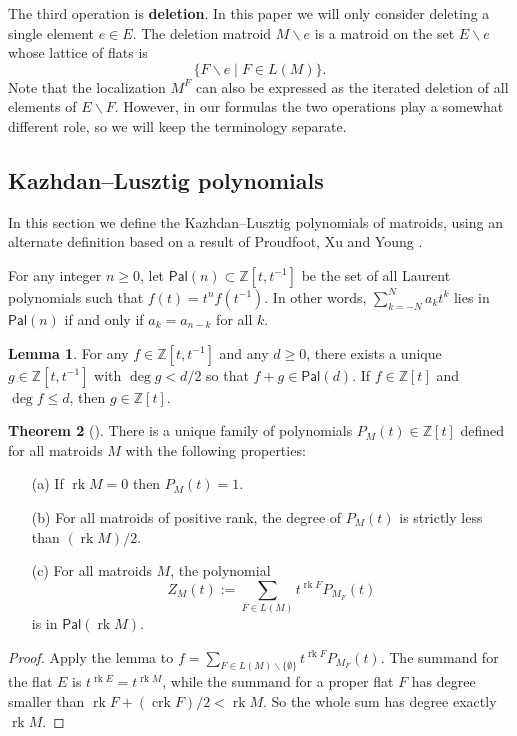 \documentclass[12pt,reqno]{amsart}
\theoremstyle{definition}
\newtheorem{theorem}{Theorem}[section]
\newtheorem{lemma}[theorem]{Lemma}
\theoremstyle{remark}
\newcommand{\crk}{\operatorname{crk}}
\newcommand{\ssm}{\smallsetminus}
\newcommand{\rk}{\operatorname{rk}}
\newcommand{\Z}{{\mathbb{Z}}}
\renewcommand{\(}{\left(}
\renewcommand{\)}{\right)}
\newcommand{\<}{\left<}
\renewcommand{\>}{\right>}
\renewcommand{\setminus}{\smallsetminus}
\newcommand{\Pal}{\mathsf{Pal}}
\begin{document}
The third operation is \textbf{deletion}.  In this paper we will only consider deleting a single element $e \in E$.  The deletion matroid $M \ssm e$ is a matroid on the set $E \ssm e$ whose lattice of flats is 
\[\{F \ssm e \mid F \in L(M)\}.\]
Note that the localization $M^F$ can also be expressed as the iterated deletion of all elements of $E \setminus F$.  However, in our formulas the two operations play a somewhat different role, so we will keep the terminology separate.

\subsection{Kazhdan--Lusztig polynomials}

In this section we define the Kazhdan--Lusztig polynomials of matroids, using an alternate definition based on a result of Proudfoot, Xu and Young \cite{PXY}.

For any integer $n\ge 0$, let  $\Pal(n) \subset \Z[t, t^{-1}]$ be the set of all Laurent polynomials
such that $f(t) = t^n f(t^{-1})$.  In other words,
$\sum_{k=-N}^N a_kt^k$ lies in $\Pal(n)$ if and only if $a_k = a_{n-k}$ for all $k$.

\begin{lemma}\label{lem:palindromic}
For any  $f\in \Z[t,t^{-1}]$ and any $d \ge 0$, there exists a unique $g \in \Z[t,t^{-1}]$ with $\deg g < d/2$ so that $f + g \in \Pal(d)$.  If $f \in \Z[t]$ and $\deg f \le d$, then $g \in \Z[t]$.
\end{lemma}

\begin{theorem}[\cite{PXY}]\label{thm:KL poly def}
There is a unique family of polynomials $P_M(t) \in \Z[t]$ defined for all matroids $M$ with the following properties:
\begin{enumerate}
\item[(a)] If $\rk M =0$ then $P_M(t) = 1$.
\item[(b)] For all matroids of positive rank, the degree of $P_M(t)$ is strictly less than $(\rk M)/2$.
\item[(c)] For all matroids $M$, the polynomial
\begin{equation}\label{eqn:Z-polynomial}
Z_M(t) := \sum_{F\in L(M)} t^{\rk F}P_{M_F}(t)
\end{equation}
is in $\Pal(\rk M)$. 
\end{enumerate}
\end{theorem}
\begin{proof}
Apply the lemma to $f = \sum_{F \in L(M) \ssm \{\emptyset\}} t^{\rk F}P_{M_F}(t)$.  The summand for the flat $E$ is $t^{\rk E} = t^{\rk M}$, while the summand for a proper flat $F$ has degree 
smaller than $\rk F + (\crk F)/2 < \rk M$.  So the whole sum has degree exactly $\rk M$.
\end{proof}
\end{document}
